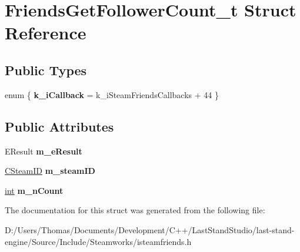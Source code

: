 \hypertarget{structFriendsGetFollowerCount__t}{}\section{Friends\+Get\+Follower\+Count\+\_\+t Struct Reference}
\label{structFriendsGetFollowerCount__t}
\subsection*{Public Types}
\begin{DoxyCompactItemize}
\item 
\hypertarget{structFriendsGetFollowerCount__t_a4f84fdb41a28f89240d615781aba299f}{}enum \{ {\bfseries k\+\_\+i\+Callback} = k\+\_\+i\+Steam\+Friends\+Callbacks + 44
 \}\label{structFriendsGetFollowerCount__t_a4f84fdb41a28f89240d615781aba299f}

\end{DoxyCompactItemize}
\subsection*{Public Attributes}
\begin{DoxyCompactItemize}
\item 
\hypertarget{structFriendsGetFollowerCount__t_a846a97afd966cbc772ed2f56cae8467f}{}E\+Result {\bfseries m\+\_\+e\+Result}\label{structFriendsGetFollowerCount__t_a846a97afd966cbc772ed2f56cae8467f}

\item 
\hypertarget{structFriendsGetFollowerCount__t_a511ffa811d71842a84c68eab3789873a}{}\hyperlink{classCSteamID}{C\+Steam\+I\+D} {\bfseries m\+\_\+steam\+I\+D}\label{structFriendsGetFollowerCount__t_a511ffa811d71842a84c68eab3789873a}

\item 
\hypertarget{structFriendsGetFollowerCount__t_ac1c2521cf06691e4ce7437460fbbfdef}{}\hyperlink{SDL__thread_8h_a6a64f9be4433e4de6e2f2f548cf3c08e}{int} {\bfseries m\+\_\+n\+Count}\label{structFriendsGetFollowerCount__t_ac1c2521cf06691e4ce7437460fbbfdef}

\end{DoxyCompactItemize}


The documentation for this struct was generated from the following file\+:\begin{DoxyCompactItemize}
\item 
D\+:/\+Users/\+Thomas/\+Documents/\+Development/\+C++/\+Last\+Stand\+Studio/last-\/stand-\/engine/\+Source/\+Include/\+Steamworks/isteamfriends.\+h\end{DoxyCompactItemize}
